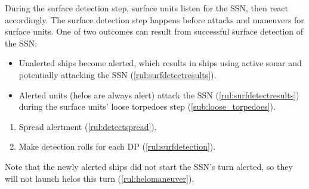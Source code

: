 \documentclass[../TacSubMicroRules.tex]{subfiles}
\begin{document}
During the surface detection step, surface units listen for the SSN, then react accordingly.
The surface detection step happens before attacks and maneuvers for surface units.
One of two outcomes can result from successful surface detection of the SSN:
\begin{itemize}
    \item Unalerted ships become alerted, which results in ships using active sonar and potentially attacking the SSN (\ref{rul:surfdetectresults}).
    \item Alerted units (helos are always alert) attack the SSN (\ref{rul:surfdetectresults}) during the surface units' loose torpedoes step (\ref{sub:loose_torpedoes}).
\end{itemize}
\begin{enumerate}
    \item Spread alertment (\ref{rul:detectspread}).
    \item Make detection rolls for each DP (\ref{rul:surfdetection}).
\end{enumerate}

 
Note that the newly alerted ships did not start the SSN's turn alerted, so they will not launch helos this turn (\ref{rul:helomaneuver}).
\end{document}
